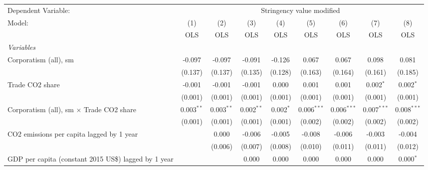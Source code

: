
\begingroup
\centering
\begin{tabular}{lcccccccc}
   \toprule
   Dependent Variable: & \multicolumn{8}{c}{Stringency value modified}\\
   Model:                                                     & (1)          & (2)          & (3)          & (4)         & (5)           & (6)           & (7)           & (8)\\  
                                                              &  OLS         & OLS          & OLS          & OLS         & OLS           & OLS           & OLS           & OLS\\  
   \midrule
   \emph{Variables}\\
   Corporatism (all), sm                                      & -0.097       & -0.097       & -0.091       & -0.126      & 0.067         & 0.067         & 0.098         & 0.081\\   
                                                              & (0.137)      & (0.137)      & (0.135)      & (0.128)     & (0.163)       & (0.164)       & (0.161)       & (0.185)\\   
   Trade CO2 share                                            & -0.001       & -0.001       & -0.001       & 0.000       & 0.001         & 0.001         & 0.002$^{*}$   & 0.002$^{*}$\\   
                                                              & (0.001)      & (0.001)      & (0.001)      & (0.001)     & (0.001)       & (0.001)       & (0.001)       & (0.001)\\   
   Corporatism (all), sm $\times$ Trade CO2 share             & 0.003$^{**}$ & 0.003$^{**}$ & 0.002$^{**}$ & 0.002$^{*}$ & 0.006$^{***}$ & 0.006$^{***}$ & 0.007$^{***}$ & 0.008$^{***}$\\   
                                                              & (0.001)      & (0.001)      & (0.001)      & (0.001)     & (0.002)       & (0.002)       & (0.002)       & (0.002)\\   
   CO2 emissions per capita lagged by 1 year                  &              & 0.000        & -0.006       & -0.005      & -0.008        & -0.006        & -0.003        & -0.004\\   
                                                              &              & (0.006)      & (0.007)      & (0.008)     & (0.010)       & (0.011)       & (0.011)       & (0.012)\\   
   GDP per capita (constant 2015 US\$) lagged by 1 year       &              &              & 0.000        & 0.000       & 0.000         & 0.000         & 0.000         & 0.000$^{*}$\\   

\end{tabular}
